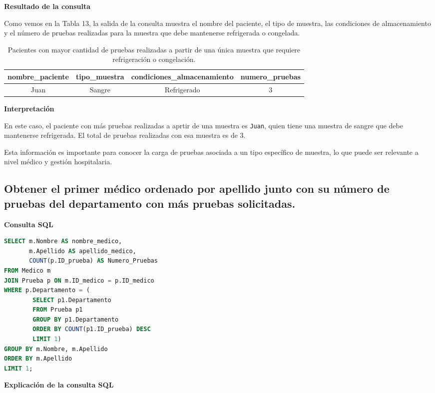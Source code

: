 \documentclass[spanish]{article}
\begin{document}
\textbf{Resultado de la consulta}

Como vemos en la Tabla 13, la salida de la consulta muestra el nombre del paciente, el tipo de muestra, las condiciones de almacenamiento y el número de pruebas realizadas para la muestra que debe mantenerse refrigerada o congelada. 

\begin{table}[h!]
\centering
\begin{tabular}{|c|c|c|c|}
\hline
\textbf{nombre\_paciente} & \textbf{tipo\_muestra} & \textbf{condiciones\_almacenamiento} & \textbf{numero\_pruebas} \\
\hline
Juan & Sangre & Refrigerado & 3 \\
\hline
\end{tabular}
\caption{Pacientes con mayor cantidad de pruebas realizadas a partir de una única muestra que requiere refrigeración o congelación.}
\label{tab:historial_prueba}
\end{table}

\textbf{Interpretación}

En este caso, el paciente con más pruebas realizadas a aprtir de una muestra es \texttt{Juan}, quien tiene una muestra de sangre que debe mantenerse refrigerada. El total de pruebas realizadas con esa muestra es de 3. 

Esta información es importante para conocer la carga de pruebas asociada a un tipo específico de muestra, lo que puede ser relevante a nivel médico y gestión hospitalaria.


\subsection{Obtener el primer médico ordenado por apellido junto con su número de pruebas del departamento con más pruebas solicitadas.}

\textbf{Consulta SQL}
\begin{lstlisting}[language=SQL]
SELECT m.Nombre AS nombre_medico, 
       m.Apellido AS apellido_medico, 
       COUNT(p.ID_prueba) AS Numero_Pruebas
FROM Medico m
JOIN Prueba p ON m.ID_medico = p.ID_medico
WHERE p.Departamento = (
        SELECT p1.Departamento
        FROM Prueba p1
        GROUP BY p1.Departamento
        ORDER BY COUNT(p1.ID_prueba) DESC
        LIMIT 1)
GROUP BY m.Nombre, m.Apellido
ORDER BY m.Apellido
LIMIT 1;
\end{lstlisting}

\textbf{Explicación de la consulta SQL}
\end{document}
